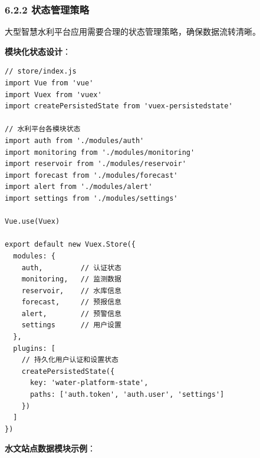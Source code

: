 \subsubsection{6.2.2
状态管理策略}\label{ux72b6ux6001ux7ba1ux7406ux7b56ux7565}

大型智慧水利平台应用需要合理的状态管理策略，确保数据流转清晰。

\textbf{模块化状态设计}：

\begin{lstlisting}
// store/index.js
import Vue from 'vue'
import Vuex from 'vuex'
import createPersistedState from 'vuex-persistedstate'

// 水利平台各模块状态
import auth from './modules/auth'
import monitoring from './modules/monitoring'
import reservoir from './modules/reservoir'
import forecast from './modules/forecast'
import alert from './modules/alert'
import settings from './modules/settings'

Vue.use(Vuex)

export default new Vuex.Store({
  modules: {
    auth,         // 认证状态
    monitoring,   // 监测数据
    reservoir,    // 水库信息
    forecast,     // 预报信息
    alert,        // 预警信息
    settings      // 用户设置
  },
  plugins: [
    // 持久化用户认证和设置状态
    createPersistedState({
      key: 'water-platform-state',
      paths: ['auth.token', 'auth.user', 'settings']
    })
  ]
})
\end{lstlisting}

\textbf{水文站点数据模块示例}：

